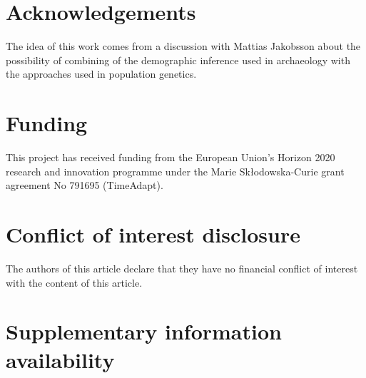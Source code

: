 \documentclass[a4paper]{article}
\begin{document}





\section*{\centering Acknowledgements}

The idea of this work comes from a discussion with Mattias Jakobsson about the possibility of combining of the demographic inference used in archaeology with the approaches used in population genetics. 

\section*{\centering Funding}

This project has received funding from the European Union’s Horizon 2020 research and innovation programme under the Marie Skłodowska-Curie grant agreement No 791695 (TimeAdapt).

\section*{\centering Conflict of interest disclosure}

The authors of this article declare that they have no financial conflict of interest with the content of this article.



\section*{\centering Supplementary information availability}
\end{document}
